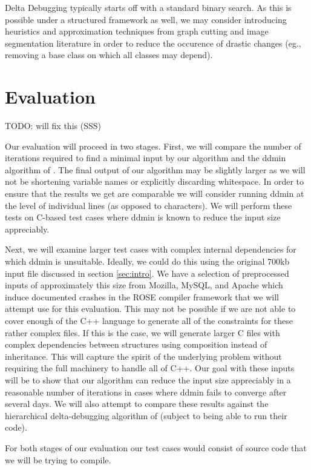 \documentclass[preprint]{acm_proc_article-sp}
\begin{document}
Delta Debugging typically starts off with a standard binary search. As this is
possible under a structured framework as well, we may consider introducing
heuristics and approximation techniques from graph cutting and image
segmentation literature \citep{nc} in order to reduce the occurence of
drastic changes (eg., removing a base class on which all classes may depend).


\section{Evaluation}
TODO: will fix this (SSS)

Our evaluation will proceed in two stages.  First, we will compare the number of
iterations required to find a minimal input by our algorithm and the ddmin
algorithm of \citeauthor{dd}.  The final output of our algorithm may be slightly
larger as we will not be shortening variable names or explicitly discarding
whitespace.  In order to ensure that the results we get are comparable we will
consider running ddmin at the level of individual lines (as opposed to
characters). We will perform these tests on C-based test cases where ddmin is
known to reduce the input size appreciably.

Next, we will examine larger test cases with complex internal dependencies for
which ddmin is unsuitable.  Ideally, we could do this using the original 700kb
input file discussed in section \ref{sec:intro}.  We have a selection of
preprocessed inputs of approximately this size from Mozilla, MySQL, and Apache
which induce documented crashes in the ROSE compiler framework \citep{rose} that
we will attempt use for this evaluation.  This may not be possible if we are not
able to cover enough of the C++ language to generate all of the constraints for
these rather complex files.  If this is the case, we will generate larger C
files with complex dependencies between structures using composition instead of
inheritance.  This will capture the spirit of the underlying problem without
requiring the full machinery to handle all of C++.  Our goal with these inputs
will be to show that our algorithm can reduce the input size appreciably in a
reasonable number of iterations in cases where ddmin fails to converge after
several days. We will also attempt to compare these results against the
hierarchical delta-debugging algorithm of \citeauthor{hdd} (subject to being
able to run their code).

For both stages of our evaluation our test cases would consist of source code
that we will be trying to compile.
\end{document}
